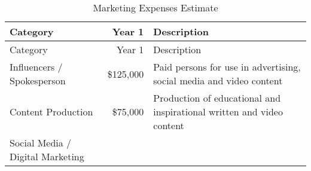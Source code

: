 \documentclass[10pt,openany]{book}
\begin{document}
\begin{longtable}[]{@{}lrl@{}}
\caption{Marketing Expenses Estimate}\tabularnewline
\toprule
\begin{minipage}[b]{0.32\columnwidth}\raggedright
Category\strut
\end{minipage} & \begin{minipage}[b]{0.11\columnwidth}\raggedleft
Year 1\strut
\end{minipage} & \begin{minipage}[b]{0.48\columnwidth}\raggedright
Description\strut
\end{minipage}\tabularnewline
\midrule
\endfirsthead
\toprule
\begin{minipage}[b]{0.32\columnwidth}\raggedright
Category\strut
\end{minipage} & \begin{minipage}[b]{0.11\columnwidth}\raggedleft
Year 1\strut
\end{minipage} & \begin{minipage}[b]{0.48\columnwidth}\raggedright
Description\strut
\end{minipage}\tabularnewline
\midrule
\endhead
\begin{minipage}[t]{0.32\columnwidth}\raggedright
Influencers / Spokesperson\strut
\end{minipage} & \begin{minipage}[t]{0.11\columnwidth}\raggedleft
\$125,000\strut
\end{minipage} & \begin{minipage}[t]{0.48\columnwidth}\raggedright
Paid persons for use in advertising, social media and video
content\strut
\end{minipage}\tabularnewline
\begin{minipage}[t]{0.32\columnwidth}\raggedright
Content Production\strut
\end{minipage} & \begin{minipage}[t]{0.11\columnwidth}\raggedleft
\$75,000\strut
\end{minipage} & \begin{minipage}[t]{0.48\columnwidth}\raggedright
Production of educational and inspirational written and video
content\strut
\end{minipage}\tabularnewline
\begin{minipage}[t]{0.32\columnwidth}\raggedright
Social Media / Digital Marketing\strut
\end{minipage} & \begin{minipage}[t]{0.11\columnwidth}\raggedleft

\end{minipage}
\end{longtable}
\end{document}
